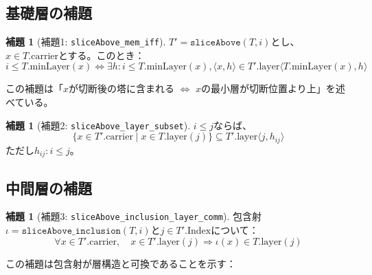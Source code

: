 \documentclass[a4paper,11pt]{article}
\theoremstyle{definition}
\newtheorem{lemma}[definition]{補題}
\begin{document}
\subsection{基礎層の補題}

\begin{lemma}[補題1: \texttt{sliceAbove\_mem\_iff}]
$T' = \texttt{sliceAbove}(T, i)$とし、$x \in T.\text{carrier}$とする。このとき：
\[
i \leq T.\text{minLayer}(x) \iff \exists h : i \leq T.\text{minLayer}(x), \langle x, h \rangle \in T'.\text{layer}\langle T.\text{minLayer}(x), h \rangle
\]
\end{lemma}

\begin{geometric}
この補題は「$x$が切断後の塔に含まれる $\iff$ $x$の最小層が切断位置より上」を述べている。
\end{geometric}

\begin{lemma}[補題2: \texttt{sliceAbove\_layer\_subset}]
$i \leq j$ならば、
\[
\{x \in T'.\text{carrier} \mid x \in T.\text{layer}(j)\} \subseteq T'.\text{layer}\langle j, h_{ij} \rangle
\]
ただし$h_{ij} : i \leq j$。
\end{lemma}

\subsection{中間層の補題}

\begin{lemma}[補題3: \texttt{sliceAbove\_inclusion\_layer\_comm}]
包含射$\iota = \texttt{sliceAbove\_inclusion}(T, i)$と$j \in T'.\text{Index}$について：
\[
\forall x \in T'.\text{carrier}, \quad x \in T'.\text{layer}(j) \Rightarrow \iota(x) \in T.\text{layer}(j)
\]
\end{lemma}

この補題は包含射が層構造と可換であることを示す：

\begin{center}
\end{center}
\end{document}
